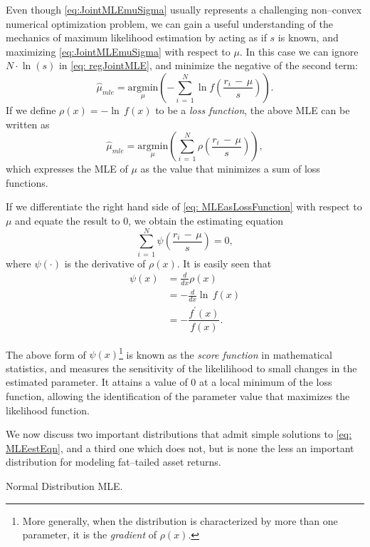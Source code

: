 \documentclass[graybox,envcountchap,sectrefs]{svmono}\usepackage[]{graphicx}\usepackage[]{xcolor}
\begin{document}
\begin{appendices}
Even though \eqref{eq:JointMLEmuSigma} usually represents a challenging
non--convex numerical optimization problem, we can gain a useful
understanding of the mechanics of maximum likelihood estimation by
acting as if $s$ is known, and maximizing \eqref{eq:JointMLEmuSigma}
with respect to $\mu$. In this case we can ignore $N\cdot\ln(s)$
in \eqref{eq: regJointMLE}, and minimize the negative of the second
term:
\begin{equation}
\hat{\mu}_{mle}=\underset{\mu}{\mathrm{argmin}}\left(-\sum_{i\,=\,1}^{N}\ln f\left(\frac{r_{i}\,-\,\mu}{s}\right)\right).\label{eq:MLEsknown}
\end{equation}
If we define $\rho(x)=-\ln\,f(x)$ to be a \emph{loss function}, the
above MLE can be written as
\begin{equation}
\hat{\mu}_{mle}=\underset{\mu}{\mathrm{argmin}}\left(\sum_{i\,=\,1}^{N}\rho\left(\frac{r_{i}\,-\,\mu}{s}\right)\right),\label{eq: MLEasLossFunction}
\end{equation}
which expresses the MLE of $\mu$ as the value that minimizes a sum
of loss functions.

If we differentiate the right hand side of \eqref{eq: MLEasLossFunction}
with respect to $\mu$ and equate the result to 0, we obtain the estimating
equation
\begin{equation}
\sum_{i\,=\,1}^{N}\psi\left(\frac{r_{i}\,-\,\mu}{s}\right)=0,\label{eq: MLEestEqn}
\end{equation}
where $\psi(\cdot)$ is the derivative of $\rho\left(x\right)$. It
is easily seen that
\begin{align}
\psi(x) & =\frac{d}{dx}\rho(x)\nonumber \\
 & =-\frac{d}{dx}\ln\,f(x)\nonumber \\
 & =-\dfrac{f^{\prime}(x)}{f(x)}.\label{eq: scoreFunction}
\end{align}

The above form of $\psi(x)$\footnote{More generally, when the distribution is characterized by more than
one parameter, it is the \emph{gradient} of $\rho\left(x\right)$.} is known as the \emph{score function} in mathematical statistics,
and measures the sensitivity of the likelilihood to small changes
in the estimated parameter. It attains a value of 0 at a local minimum
of the loss function, allowing the identification of the parameter
value that maximizes the likelihood function.

We now discuss two important distributions that admit simple solutions
to \eqref{eq: MLEestEqn}, and a third one which does not, but is
none the less an important distribution for modeling fat--tailed
asset returns.
\begin{example}
Normal Distribution MLE.\label{exa:NormalDistributionMLE.}


\end{example}
\end{appendices}
\end{document}
